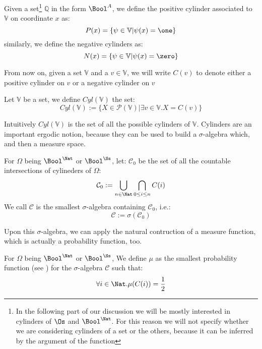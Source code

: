 \begin{conditional}{\notappendix}
  \begin{defn}
    Given a set\footnote{  In the following part of our discussion we will be mostly interested in cylinders
      of $\Os$ and $\Bool^\Nat$. For this reason we will not specify whether we are considering
      cylinders of a set or the others, because it can be inferred by the argument of the function
}
    $\mathbb Q$ in the form $\Bool^A$, we define the positive
    cylinder associated to $\mathbb V$ on coordinate $x$ as:
    \[
      P(x) = \{ \psi \in \mathbb V | \psi(x)= \one \}
    \]
    similarly, we define the negative cylinders as:
    \[
      N(x) = \{ \psi \in \mathbb V | \psi(x)= \zero \}
    \]
  \end{defn}

  \begin{notation}
    From now on, given a set $\mathbb V$ and a $v \in \mathbb V$, we will write
    $C(v)$ to denote either a positive cylinder on $v$ or a negative cylinder on
    $v$
  \end{notation}

  \begin{defn}
    Let $\mathbb V$ be a set, we define $\mathit{Cyl}(\mathbb V)$ the set:
    $$
    \mathit{Cyl}(\mathbb V):=\{ X \in \mathcal P(\mathbb V)| \exists v \in \mathbb V.
    X = C(v)\}
    $$
  \end{defn}

  Intuitively $\mathit{Cyl}(\mathbb V)$ is the set of all the possible cylinders
  of $\mathbb V$.
  Cylinders are an important ergodic notion, because they can be used to build a
  $\sigma$-algebra which, and then a measure space.

  \begin{defn}
    \label{def:cylsigmaalgebra}
    For $\Omega$ being $\Bool^\Nat$ or $\Bool^\Ss$,
    let: $\mathcal C_0$ be the set of all the countable intersections of cylineders
    of $\Omega$:
    $$
      \mathcal C_0 := \bigcup_{n \in \Nat}\bigcap_{0 \le i \le n} C(i)
    $$
    We call $\mathcal C$ is the smallest $\sigma$-algebra containing
    $\mathcal C_0$, i.e.:
    $$
      \mathcal C := \sigma(\mathcal C_0)
    $$
  \end{defn}

  Upon this $\sigma$-algebra, we can apply the natural contruction of a measure
  function, which is actually a probability function, too.

  \begin{defn}
    For $\Omega$ being $\Bool^\Nat$ or $\Bool^\Ss$,
    We define $\mu$ as the smallest probability function (see \cite{billingsley})
    for the $\sigma$-algebra
    $\mathcal C$ such that:
    $$
    \forall i \in \Nat.\mu(C(i))=\frac 1 2
    $$
  \end{defn}






\end{conditional}
